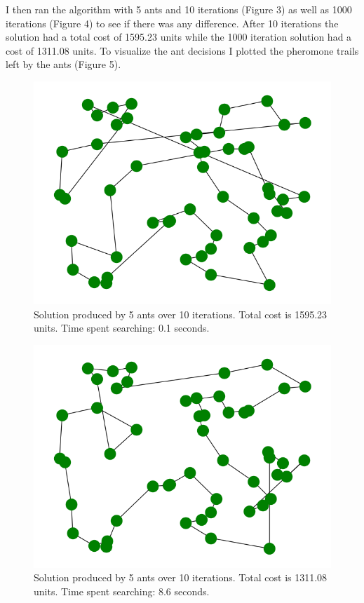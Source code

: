 \documentclass[twocolumn]{article}
\begin{document}
I then ran the algorithm with 5 ants and 10 iterations (Figure 3) as well as 1000 
iterations (Figure 4) to see if there was any difference. After 10 iterations the 
solution had a total cost of 1595.23 units while the 1000 iteration solution had a 
cost of 1311.08 units. To visualize the ant decisions I plotted the pheromone trails left by the ants (Figure 5). 

\begin{figure}[h!]
\centering
\includegraphics[width=\linewidth]{Ant_52_nodes_10_iterations.png}
\caption{
    Solution produced by 5 ants over 10 iterations. Total cost is
    1595.23 units. Time spent searching: 0.1 seconds.
}
\label{fig:tenItters}
\end{figure}

\begin{figure}[h!]
\centering
\includegraphics[width=\linewidth]{Ant_52_nodes_1000_iterations.png}
\caption{
    Solution produced by 5 ants over 10 iterations. Total cost is
    1311.08 units. Time spent searching: 8.6 seconds.
}
\label{fig:thousandItters}
\end{figure}
\end{document}
